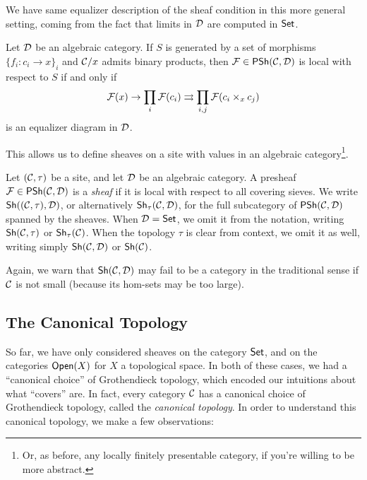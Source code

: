We have same equalizer description of the sheaf condition in this more general setting, coming from the fact that limits in $\catD$ are computed in $\Set$.

\begin{proposition}\label{prop:chap:sheaves:sec:sites:sheaf condition as equalizer in algebraic category}
    Let $\catD$ be an algebraic category. If $S$ is generated by a set of morphisms $\{f_i : c_i \to x\}_i$ and $\catC/x$ admits binary products, then $\cal{F} \in \PSh(\catC,\catD)$ is local with respect to $S$ if and only if
    \[\cal{F}(x) \to \prod_i \cal{F}(c_i) \rightrightarrows \prod_{i,j} \cal{F}(c_i \times_x c_j)\]
    is an equalizer diagram in $\catD$.
\end{proposition}

This allows us to define sheaves on a site with values in an algebraic category\footnote{Or, as before, any locally finitely presentable category, if you're willing to be more abstract.}.

\begin{definition}\label{def:chap:sheaves:sec:sites:sheaf}
    Let $(\catC, \tau)$ be a site, and let $\catD$ be an algebraic category. A presheaf $\cal{F} \in \PSh(\catC,\catD)$ is a \emph{sheaf} if it is local with respect to all covering sieves. We write $\Sh((\catC,\tau),\catD)$, or alternatively $\Sh_{\tau}(\catC,\catD)$, for the full subcategory of $\PSh(\catC,\catD)$ spanned by the sheaves. When $\catD = \Set$, we omit it from the notation, writing $\Sh(\catC,\tau)$ or $\Sh_{\tau}(\catC)$. When the topology $\tau$ is clear from context, we omit it as well, writing simply $\Sh(\catC,\catD)$ or $\Sh(\catC)$.
\end{definition}

Again, we warn that $\Sh(\catC,\catD)$ may fail to be a category in the traditional sense if $\catC$ is not small (because its hom-sets may be too large).

\subsection{The Canonical Topology}

So far, we have only considered sheaves on the category $\Set$, and on the categories $\Open(X)$ for $X$ a topological space. In both of these cases, we had a ``canonical choice'' of Grothendieck topology, which encoded our intuitions about what ``covers'' are. In fact, every category $\catC$ has a canonical choice of Grothendieck topology, called the \emph{canonical topology}. In order to understand this canonical topology, we make a few observations:


